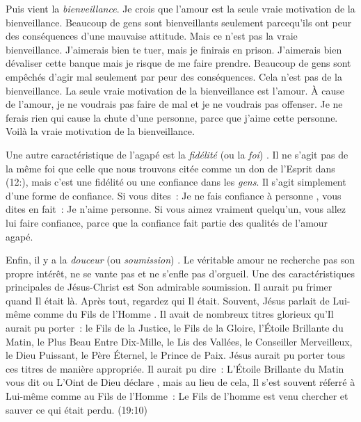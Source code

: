 Puis vient la \emph{bienveillance}. Je crois que l'amour est la seule
 vraie motivation de la bienveillance.
 Beaucoup de gens sont bienveillants seulement parcequ'ils ont peur
 des conséquences d'une mauvaise attitude.
 Mais ce n'est pas la vraie bienveillance.
 \og J'aimerais bien te tuer, mais je finirais en prison. \fg{}
 \og J'aimerais bien dévaliser cette banque mais je risque
 de me faire prendre. \fg{}
 Beaucoup de gens sont empêchés d'agir mal seulement par peur
 des conséquences. Cela n'est pas de la bienveillance.
 La seule vraie motivation de la bienveillance est l'amour.
 À cause de l'amour, je ne voudrais pas faire de mal
 et je ne voudrais pas offenser. Je ne ferais rien qui cause
 la chute d'une personne, parce que j'aime cette personne.
 Voilà la vraie motivation de la bienveillance.

\begin{specialpar}{}
Une autre caractéristique de l'agapé est la \emph{fidélité}
 (ou la \emph{foi})
 .
 Il ne s'agit pas de la même foi que celle que nous trouvons citée
 comme un don de l'Esprit dans (12:),
 mais c'est une fidélité ou une confiance dans les \emph{gens}.
 Il s'agit simplement d'une forme de confiance. Si vous dites~:
 \og Je ne fais confiance à personne \fg{}, vous dites en fait~:
 \og Je n'aime personne. \fg{}
 Si vous aimez vraiment quelqu'un, vous allez lui faire confiance,
 parce que la confiance fait partie des qualités de l'amour agapé.
\end{specialpar}

\begin{specialpar}{}
Enfin, il y a la \emph{douceur} (ou \emph{soumission})
 .
 Le véritable amour ne recherche pas son propre intérêt,
 ne se vante pas et ne s'enfle pas d'orgueil.
 Une des caractéristiques principales de Jésus-Christ
 est Son admirable soumission. Il aurait pu frimer quand Il était là.
 Après tout, regardez qui Il était. Souvent, Jésus parlait de Lui-même
 comme du \og Fils de l'Homme \fg{}.
 Il avait de nombreux titres glorieux qu'Il aurait pu porter~:
 le Fils de la Justice, le Fils de la Gloire, l'Étoile Brillante du Matin,
 le Plus Beau Entre Dix-Mille, le Lis des Vallées,
 le Conseiller Merveilleux, le Dieu Puissant, le Père Éternel,
 le Prince de Paix. Jésus aurait pu porter tous ces titres
 de manière appropriée. Il aurait pu dire~:
 \og L'Étoile Brillante du Matin vous dit \fg{} ou
 \og L'Oint de Dieu déclare \fg{}, mais au lieu de cela,
 Il s'est souvent réferré à Lui-même comme au Fils de l'Homme~:
 \og Le Fils de l'homme est venu chercher et sauver
 ce qui était perdu. \fg{} (19:10)
\end{specialpar}

